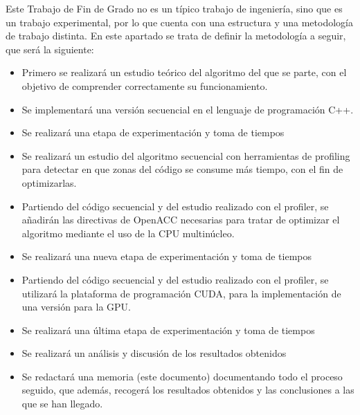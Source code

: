 Este Trabajo de Fin de Grado no es un típico trabajo de ingeniería, sino que es un trabajo experimental, por lo que cuenta con una estructura y una metodología de trabajo distinta. En este apartado se trata de definir la metodología a seguir, que será la siguiente: \\

\begin{itemize}
    \item Primero se realizará un estudio teórico del algoritmo del que se parte, con el objetivo de comprender correctamente su funcionamiento.
    \item Se implementará una versión secuencial en el lenguaje de programación C++.
    \item Se realizará una etapa de experimentación y toma de tiempos 
    \item Se realizará un estudio del algoritmo secuencial con herramientas de profiling para detectar en que zonas del código se consume más tiempo, con el fin de optimizarlas.
    \item Partiendo del código secuencial y del estudio realizado con el profiler, se añadirán las directivas de OpenACC necesarias para tratar de optimizar el algoritmo mediante el uso de la CPU multinúcleo.
    \item Se realizará una nueva etapa de experimentación y toma de tiempos
    \item Partiendo del código secuencial y del estudio realizado con el profiler, se utilizará la plataforma de programación CUDA, para la implementación de una versión para la GPU.
    \item Se realizará una última etapa de experimentación y toma de tiempos 
    \item Se realizará un análisis y discusión de los resultados obtenidos
    \item Se redactará una memoria (este documento) documentando todo el proceso seguido, que además, recogerá los resultados obtenidos y las conclusiones a las que se han llegado.
\end{itemize}
 
